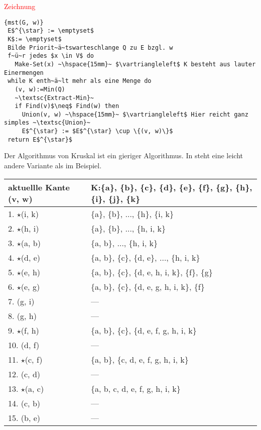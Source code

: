 \documentclass[ngerman,draft,parskip=half*,twoside]{scrreprt}
\theoremstyle{break}
\theoremstyle{nonumberbreak}
\begin{document}
\textcolor{red}{Zeichnung}

\begin{Algorithmus}[H]
\begin{lstlisting}[frame=tlrb, mathescape=true, title=\textsc{mst\textnormal{(G, w)}}, gobble=1]{mst(G, w)}
 E$^{\star} := \emptyset$
 K$:= \emptyset$
 Bilde Priorit~ä~tswarteschlange Q zu E bzgl. w
 f~ü~r jedes $x \in V$ do
   Make-Set(x) ~\hspace{15mm}~ $\vartriangleleft$ K besteht aus lauter Einermengen
 while K enth~ä~lt mehr als eine Menge do
   (v, w):=Min(Q)
   ~\textsc{Extract-Min}~
   if Find(v)$\neq$ Find(w) then
     Union(v, w) ~\hspace{15mm}~ $\vartriangleleft$ Hier reicht ganz simples ~\textsc{Union}~
     E$^{\star} := $E$^{\star} \cup \{(v, w)\}$
 return E$^{\star}$   
\end{lstlisting}
Der Algorithmus von Kruskal ist ein gieriger Algorithmus. In \cite{cormen} steht eine leicht andere Variante als im
Beispiel.
\end{Algorithmus}

\begin{tabular}{|l|l|}
aktuellle Kante (v, w) & K:\{a\}, \{b\}, \{c\}, \{d\}, \{e\}, \{f\}, \{g\}, \{h\}, \{i\}, \{j\}, \{k\}\\
\hline
1.  $\star$(i, k) & \{a\}, \{b\}, $\ldots$, \{h\}, \{i, k\}\\
2.  $\star$(h, i) & \{a\}, \{b\}, $\ldots$, \{h, i, k\}\\
3.  $\star$(a, b) & \{a, b\}, $\ldots$, \{h, i, k\}\\
\hline
4.  $\star$(d, e) & \{a, b\}, \{c\}, \{d, e\}, $\ldots$, \{h, i, k\}\\
5.  $\star$(e, h) & \{a, b\}, \{c\}, \{d, e, h, i, k\}, \{f\}, \{g\}\\
6.  $\star$(e, g) & \{a, b\}, \{c\}, \{d, e, g, h, i, k\}, \{f\}\\
\hline
7.  (g, i) & ---\\
8.  (g, h) & ---\\
9.  $\star$(f, h) & \{a, b\}, \{c\}, \{d, e, f, g, h, i, k\}\\
\hline
10.  (d, f) & ---\\
11.  $\star$(c, f) & \{a, b\}, \{c, d, e, f, g, h, i, k\}\\
12.  (c, d) & ---\\
\hline
13.  $\star$(a, c) & \{a, b, c, d, e, f, g, h, i, k\}\\
14.  (c, b) & ---\\
15.  (b, e) & ---\\
\end{tabular}
\end{document}

